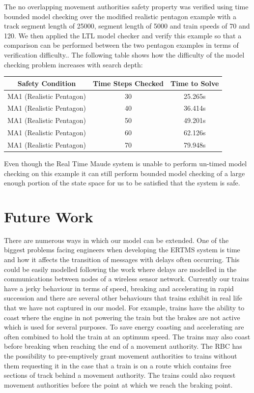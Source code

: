 The no overlapping movement authorities safety property was verified using time bounded model checking over the modified realistic pentagon example with a track segment length of 25000,  segment length of 5000 and train speeds of 70 and 120.  We then applied the LTL model checker and verify this example so that a comparison can be performed between the two pentagon examples in terms of verification difficulty.. The following table shows how the difficulty of the model checking problem increases with search depth:
\medskip
\begin{center}
\begin{tabular}{c | c | c} 
Safety Condition & Time Steps Checked & Time to Solve  \\ \hline
MA1 (Realistic Pentagon) & 30 & 25.265s \\
MA1 (Realistic Pentagon) & 40 & 36.414s \\
MA1 (Realistic Pentagon) & 50 & 49.201s \\
MA1 (Realistic Pentagon) & 60 & 62.126s \\
MA1 (Realistic Pentagon) & 70 & 79.948s \\
\end{tabular}
\end{center}
\medskip
Even though the Real Time Maude system is unable to perform un-timed model checking on this example it can still perform bounded model checking of a large enough portion of the state space for us to be satisfied that the system is safe.

\section{Future Work}
There are numerous ways in which our model can be extended. One of the biggest problems facing engineers when developing the ERTMS system is time and how it affects the transition of messages with delays often occurring. This could be easily modelled following the work \cite{PO07} where delays are modelled in the communications between nodes of a wireless sensor network. Currently our trains have a jerky behaviour in terms of speed, breaking and accelerating in rapid succession and there are several other behaviours that trains exhibit in real life that we have not captured in our model. For example, trains have the ability to coast where the engine in not powering the train but the brakes are not active which is used for several purposes. To save energy coasting and accelerating are often combined to hold the train at an optimum speed. The trains may also coast before breaking when reaching the end of a movement authority. The RBC has the possibility to pre-emptively grant movement authorities to trains without them requesting it in the case that a train is on a route which contains free sections of track behind a movement authority.  The trains could also request movement authorities before the point at which we reach the braking point.

